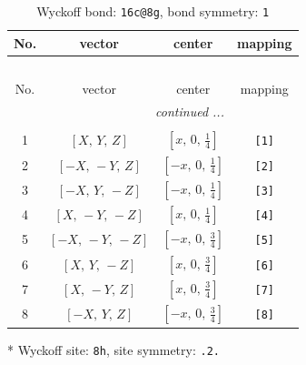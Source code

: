 \documentclass[fleqn,8pt]{jsarticle}
\begin{document}
\begin{longtable}{cccc}
\caption{Wyckoff bond: {\tt 16c@8g}, bond symmetry: {\tt 1}}
 \\
 \hline \hline
No. & vector & center & mapping \\ \hline \endfirsthead

\multicolumn{3}{l}{\tablename\ \thetable{}} \\
 \hline \hline
No. & vector & center & mapping \\ \hline \endhead

 \hline \hline
\multicolumn{3}{r}{\footnotesize\it continued ...} \\ \endfoot

 \hline \hline
\multicolumn{3}{r}{} \\ \endlastfoot

1 & $\left[ X,\, Y,\, Z \right]$ & $\left[ x,\, 0,\, \frac{1}{4} \right]$ & {\tt [1]} \\ \hline
2 & $\left[ - X,\, - Y,\, Z \right]$ & $\left[ - x,\, 0,\, \frac{1}{4} \right]$ & {\tt [2]} \\ \hline
3 & $\left[ - X,\, Y,\, - Z \right]$ & $\left[ - x,\, 0,\, \frac{1}{4} \right]$ & {\tt [3]} \\ \hline
4 & $\left[ X,\, - Y,\, - Z \right]$ & $\left[ x,\, 0,\, \frac{1}{4} \right]$ & {\tt [4]} \\ \hline
5 & $\left[ - X,\, - Y,\, - Z \right]$ & $\left[ - x,\, 0,\, \frac{3}{4} \right]$ & {\tt [5]} \\ \hline
6 & $\left[ X,\, Y,\, - Z \right]$ & $\left[ x,\, 0,\, \frac{3}{4} \right]$ & {\tt [6]} \\ \hline
7 & $\left[ X,\, - Y,\, Z \right]$ & $\left[ x,\, 0,\, \frac{3}{4} \right]$ & {\tt [7]} \\ \hline
8 & $\left[ - X,\, Y,\, Z \right]$ & $\left[ - x,\, 0,\, \frac{3}{4} \right]$ & {\tt [8]} \\
\end{longtable}
* Wyckoff site: {\tt 8h}, site symmetry: {\tt .2.}
\renewcommand{\arraystretch}{1.2}
\end{document}

